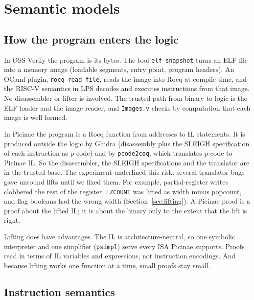\documentclass[11pt]{article}
\newcommand{\code}[1]{\texttt{#1}}
\begin{document}
\section{Semantic models}\label{sec:models}

\subsection{How the program enters the logic}

In OSS-Verify the program is its bytes.  The tool \code{elf-snapshot} turns
an ELF file into a memory image (loadable segments, entry point, program
headers).  An OCaml plugin, \code{rocq-read-file}, reads the image into Rocq
at compile time, and the RISC-V semantics in LPS decodes and executes
instructions from that image.  No disassembler or lifter is involved.  The
trusted path from binary to logic is the ELF loader and the image reader,
and \code{Images.v} checks by computation that each image is well formed.

In Picinae the program is a Rocq function from addresses to IL statements.
It is produced outside the logic by Ghidra (disassembly plus the SLEIGH
specification of each instruction as p-code) and by \code{pcode2coq}, which
translates p-code to Picinae IL.  So the disassembler, the SLEIGH
specifications and the translator are in the trusted base.  The experiment
underlined this risk: several translator bugs gave unsound lifts until we
fixed them.  For example, partial-register writes clobbered the rest of the
register, \code{LZCOUNT} was lifted as width minus popcount, and flag
booleans had the wrong width (Section~\ref{sec:lifting}).  A Picinae proof
is a proof about the lifted IL; it is about the binary only to the extent
that the lift is right.

Lifting does have advantages.  The IL is architecture-neutral, so one
symbolic interpreter and one simplifier (\code{psimpl}) serve every ISA
Picinae supports.  Proofs read in terms of IL variables and expressions, not
instruction encodings.  And because lifting works one function at a time,
small proofs stay small.

\subsection{Instruction semantics}
\end{document}
